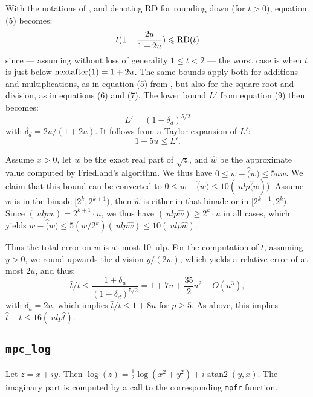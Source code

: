 \documentclass [11pt]{article}
\newcommand {\mpfr}{{\tt mpfr}}
\newcommand {\ulp}[1]{#1~ulp}
\newcommand {\atantwo}{\operatorname {atan2}}
\renewcommand {\leq}{\leqslant}
\renewcommand {\geq}{\geqslant}
\begin{document}
With the notations of \cite{jeannerod:ensl-01780265}, and denoting RD for
rounding down (for $t > 0$), equation (5) becomes:
\[ t (1 - \frac{2u}{1+2u}) \leq {\rm RD}(t) \]
since --- assuming without loss of generality $1 \leq t < 2$ ---
the worst case is when $t$ is just below ${\rm nextafter}(1) = 1+2u$.
The same bounds apply both for additions and multiplications, as in equation (5)
from \cite{jeannerod:ensl-01780265}, but also for the square root and division,
as in equations (6) and (7).
The lower bound $L'$ from equation (9) then becomes:
\[ L' = (1 - \delta_d)^{5/2} \] %
with $\delta_d = 2u/(1+2u)$. %
It follows from a Taylor expansion of $L'$:
\[ 1 - 5u \leq L'. \]

Assume $x > 0$, let $w$ be the exact real part of
$\sqrt{z}$, and $\hat{w}$ be the approximate value computed by
Friedland's algorithm.
We thus have $0 \leq w - \hat(w) \leq 5 u w$.
We claim that this bound can be converted to
$0 \leq w - \hat(w) \leq 10 \ulp(\hat(w))$.
Assume $w$ is in the binade $[2^k,2^{k+1})$, then $\hat{w}$ is either in that
binade or in $[2^{k-1},2^k)$.
Since $\ulp(w) = 2^{k+1} \cdot u$, we thus have $\ulp(\hat{w}) \geq 2^k \cdot u$ in
all cases, which yields $w - \hat(w) \leq 5 (w/2^k) \ulp(\hat{w}) \leq 10 \ulp(\hat{w})$.

Thus the total error on $w$ is at most \ulp{10}.
For the computation of $t$, assuming $y > 0$, we round upwards the division $y/(2w)$,
which yields a relative error of at most $2u$, and thus:
\[ \hat{t}/t \leq \frac{1 + \delta_u}{(1 - \delta_d)^{5/2}} = 1 + 7u + \frac{35}{2} u^2 + O(u^3), \]
with $\delta_u = 2u$,
which implies $\hat{t}/t \leq 1 + 8u$ for $p \geq 5$.
As above, this implies $\hat{t} - t \leq 16 \ulp(\hat{t})$.

\subsection {\texttt {mpc\_log}}

Let $z = x + i y$. Then $\log (z) = \frac {1}{2} \log (x^2 + y^2) + i \atantwo (y, x)$. The imaginary part is computed by a call to the corresponding {\mpfr} function.
\end{document}

